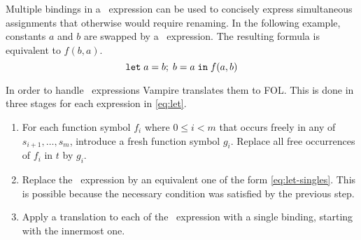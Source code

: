 Multiple bindings in a \LETIN\ expression can be used to concisely express simultaneous assignments that otherwise would require renaming. In the following example, constants $a$ and $b$ are swapped by a \LETIN\ expression. The resulting formula is equivalent to $f(b, a)$.
\begin{equation}\label{eq:parallel-let-example}
\mathtt{let}\;{a}={b};\;{b}={a}\;\mathtt{in}\;{f(a, b)}
\end{equation}

In order to handle \LETIN\ expressions Vampire translates them to FOL. This is done in three stages for each expression in \eqref{eq:let}.
\begin{enumerate}
  \item For each function symbol $f_i$ where $0 \leq i < m$ that occurs freely in any of $s_{i+1},\ldots,s_m$, introduce a fresh function symbol $g_i$. Replace all free occurrences of $f_i$ in $t$ by $g_i$.
  \item Replace the \LETIN\ expression by an equivalent one of the form \eqref{eq:let-singles}. This is possible because the necessary condition was satisfied by the previous step.
  \item Apply a translation to each of the \LETIN\ expression with a single binding, starting with the innermost one.
\end{enumerate}

